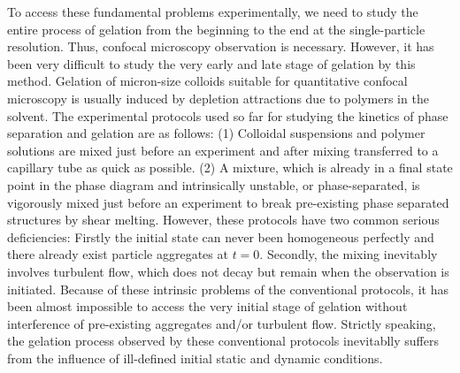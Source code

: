 \documentclass[footinbib,amsmath,amssymb,superscriptaddress,twocolumn]{revtex4}
\begin{document}
To access these fundamental problems experimentally, we need to study the entire process of gelation from the beginning to the end at the single-particle resolution. 
Thus, confocal microscopy observation is necessary. However, it has been very difficult to study the very early and late stage of gelation by this method. 
Gelation of micron-size colloids suitable for quantitative confocal microscopy is usually induced by depletion attractions due to polymers in the solvent. 
The experimental protocols used so far for studying the kinetics of phase separation and gelation are as follows: (1) Colloidal suspensions and polymer solutions are mixed just before an experiment and after mixing transferred to a capillary tube as quick as possible. 
(2) A mixture, which is already in a final state point in the phase diagram and intrinsically unstable, or phase-separated, is vigorously mixed just before an experiment to break pre-existing phase separated structures by shear melting. 
However, these protocols have two common serious deficiencies: Firstly the initial state can never been homogeneous perfectly and there already exist particle aggregates at $t=0$. Secondly, the mixing inevitably involves 
turbulent flow, which does not decay but remain when the observation is initiated. 
Because of these intrinsic problems of the conventional protocols, it has been almost impossible to access the very initial stage of gelation without interference of pre-existing aggregates and/or turbulent flow.  
Strictly speaking, the gelation process observed by these conventional protocols inevitablly suffers from the influence of ill-defined initial static and dynamic conditions. 
\end{document}
